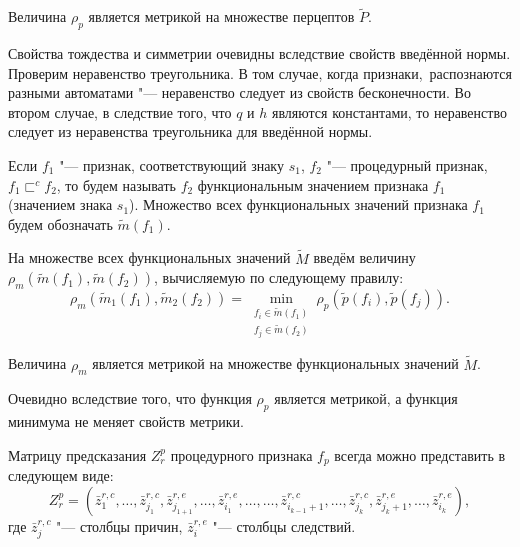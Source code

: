 \begin{Pred}
	Величина $\rho_p$ является метрикой на множестве перцептов $\tilde P$.
\end{Pred}

\begin{Proof}
	Свойства тождества и симметрии очевидны вследствие свойств введённой нормы. Проверим неравенство треугольника. В том случае, когда признаки,~распознаются разными автоматами "--- неравенство следует из свойств бесконечности. Во втором случае, в следствие того, что $q$ и $h$ являются константами, то неравенство следует из неравенства треугольника для введённой нормы.
\end{Proof}

\begin{Def}
	Если $f_1$ "--- признак, соответствующий знаку $s_1$, $f_2$ "--- процедурный признак, $f_1\sqsubset^c f_2$, то будем называть $f_2$ функциональным значением признака $f_1$ (значением знака $s_1$). Множество всех функциональных значений признака $f_1$ будем обозначать $\tilde m(f_1)$.
\end{Def}

На множестве всех функциональных значений $\tilde M$ введём величину $\rho_m(\tilde m(f_1),\tilde m(f_2))$, вычисляемую по следующему правилу:
\begin{equation}
	\rho_m(\tilde m_1(f_1),\tilde m_2(f_2 ))=\min\limits_{\substack{f_i\in\tilde m(f_1 )\\f_j\in\tilde m(f_2 )}}\rho_p(\tilde p(f_i ),\tilde p(f_j )).
\end{equation}

\begin{Pred}
	Величина $\rho_m$ является метрикой на множестве функциональных значений $\tilde M$.
\end{Pred}

\begin{Proof}
	Очевидно вследствие того, что функция $\rho_p$ является метрикой, а функция минимума не меняет свойств метрики.
\end{Proof}

Матрицу предсказания $Z_r^p$ процедурного признака $f_p$ всегда можно представить в следующем виде:
\begin{equation}
	Z_r^p=(\bar z_1^{r,c},\dots,\bar z_{j_1}^{r,c},\bar z_{j_{1+1}}^{r,e},\dots,\bar z_{i_1}^{r,e},\dots,\dots,\bar z_{i_{k-1}+1}^{r,c},\dots,\bar z_{j_k}^{r,c},\bar z_{j_k+1}^{r,e},\dots,\bar z_{i_k}^{r,e}),
\end{equation}
где $\bar z_j^{r,c}$ "--- столбцы причин, $\bar z_i^{r,e}$ "--- столбцы следствий. 


